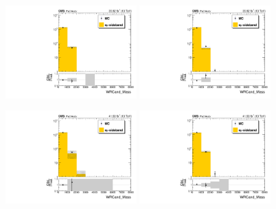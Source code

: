 \begin{figure}[htbp]
  \centering

  \includegraphics[width=0.45\textwidth]{figures/2016/Boosted_elFatJet_WRCand_Mass_HNWR_SingleElectron_Boosted_SR_TTLX_powheg.pdf}
  \hspace{0.01\textwidth}
  \includegraphics[width=0.45\textwidth]{figures/2016/Boosted_muFatJet_WRCand_Mass_HNWR_SingleMuon_Boosted_SR_TTLX_powheg.pdf}
  \vspace{0.01\textwidth}

  \includegraphics[width=0.45\textwidth]{figures/2017/Boosted_elFatJet_WRCand_Mass_HNWR_SingleElectron_Boosted_SR_TTLX_powheg.pdf}
  \hspace{0.01\textwidth}
  \includegraphics[width=0.45\textwidth]{figures/2017/Boosted_muFatJet_WRCand_Mass_HNWR_SingleMuon_Boosted_SR_TTLX_powheg.pdf}


\end{figure}
